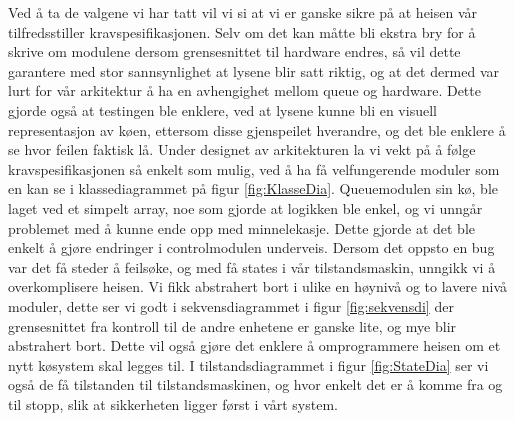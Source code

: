 \documentclass{article}
\begin{document}
Ved å ta de valgene vi har tatt vil vi si at vi er ganske sikre på at heisen vår tilfredsstiller kravspesifikasjonen. Selv om det kan måtte bli ekstra bry for å skrive om modulene dersom grensesnittet til hardware endres, så vil dette garantere med stor sannsynlighet at lysene blir satt riktig, og at det dermed var lurt for vår arkitektur å ha en avhengighet mellom queue og hardware. Dette gjorde også at testingen ble enklere, ved at lysene kunne bli en visuell representasjon av køen, ettersom disse gjenspeilet hverandre, og det ble enklere å se hvor feilen faktisk lå. Under designet av arkitekturen la vi vekt på å følge kravspesifikasjonen så enkelt som mulig, ved å ha få velfungerende moduler som en kan se i klassediagrammet på figur \ref{fig:KlasseDia}. Queuemodulen sin kø, ble laget ved et simpelt array, noe som gjorde at logikken ble enkel, og vi unngår problemet med å kunne ende opp med minnelekasje. Dette gjorde at det ble enkelt å gjøre endringer i controlmodulen underveis. Dersom det oppsto en bug var det få steder å feilsøke, og med få states i vår tilstandsmaskin, unngikk vi å overkomplisere heisen. Vi fikk abstrahert bort i ulike en høynivå og to lavere nivå moduler, dette ser vi godt i sekvensdiagrammet i figur \ref{fig:sekvensdi} der grensesnittet fra kontroll til de andre enhetene er ganske lite, og mye blir abstrahert bort. Dette vil også gjøre det enklere å omprogrammere heisen om et nytt køsystem skal legges til. I tilstandsdiagrammet i figur \ref{fig:StateDia} ser vi også de få tilstanden til tilstandsmaskinen, og hvor enkelt det er å komme fra og til stopp, slik at sikkerheten ligger først i vårt system.
\end{document}
